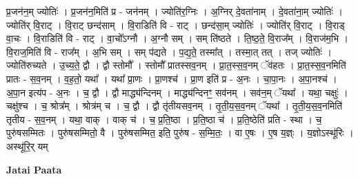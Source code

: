 \documentclass[17pt]{extarticle}
\begin{document}
प्र॒जन॑न॒म् ज्योतिः॑ । प्र॒जन॑न॒मिति॑ प्र - जन॑नम् । ज्योति॑र॒ग्निः । अ॒ग्निर् दे॒वता॑नाम् । दे॒वता॑ना॒म् ज्योतिः॑ । ज्योति॑र् वि॒राट् । वि॒राट् छन्द॑साम् । वि॒राडिति॑ वि - राट् । छन्द॑सा॒म् ज्योतिः॑ । ज्योति॑र् वि॒राट् । वि॒राड् वा॒चः । वि॒राडिति॑ वि - राट् । 
वा॒चो᳚ऽग्नौ । अ॒ग्नौ सम् । सम् ति॑ष्ठते । ति॒ष्ठ॒ते॒ वि॒राज᳚म् । वि॒राज॑म॒भि । वि॒राज॒मिति॑ वि - राज᳚म् । अ॒भि सम् । सम् प॑द्यते । प॒द्य॒ते॒ तस्मा᳚त् । तस्मा॒त् तत् । तज् ज्योतिः॑ । ज्योति॑रुच्यते । उ॒च्य॒ते॒ द्वौ । द्वौ स्तोमौ᳚ । स्तोमौ᳚ प्रातस्सव॒नम् । प्रा॒त॒स्स॒व॒नम् ॅव॑हतः । प्रा॒त॒स्स॒व॒नमिति॑ प्रातः - स॒व॒नम् । व॒ह॒तो॒ यथा᳚ । यथा᳚ प्रा॒णः । प्रा॒णश्च॑ । प्रा॒ण इति॑ प्र - अ॒नः । चा॒पा॒नः । अ॒पा॒नश्च॑ । अ॒पा॒न इत्य॑प - अ॒नः । च॒ द्वौ । द्वौ माद्ध्य॑न्दिनम् । माद्ध्य॑न्दिनꣳ॒॒ सव॑नम् । सव॑न॒म् ॅयथा᳚ । यथा॒ चक्षुः॑ । चक्षु॑श्च । च॒ श्रोत्र᳚म् । श्रोत्र॑म् च । च॒ द्वौ । द्वौ तृ॑तीयसव॒नम् । तृ॒ती॒य॒स॒व॒नम् ॅयथा᳚ । तृ॒ती॒य॒स॒व॒नमिति॑ तृतीय - स॒व॒नम् । यथा॒ वाक् । वाक् च॑ । च॒ प्र॒ति॒ष्ठा । प्र॒ति॒ष्ठा च॑ । प्र॒ति॒ष्ठेति॑ प्रति - स्था । च॒ पुरु॑षसम्मितः । पुरु॑षसम्मितो॒ वै । पुरु॑षसम्मित॒ इति॒ पुरु॑ष - स॒म्मि॒तः॒ । वा ए॒षः । ए॒ष य॒ज्ञ्ः । य॒ज्ञोऽस्थू॑रिः । अस्थू॑रि॒र् यम् \newline

\textbf{Jatai Paata} \newline
\end{document}
